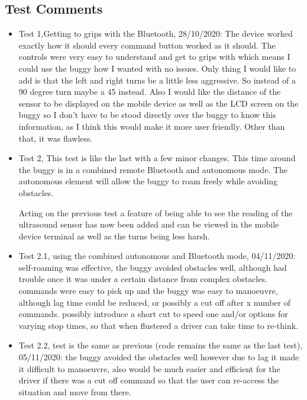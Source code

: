 \documentclass[8pt, a4paper]{article}
\begin{document}
\subsection{Test Comments}
\begin{itemize}


\item Test 1,Getting to grips with the Bluetooth, 28/10/2020: The device worked exactly how it should every command button worked as it should. The controls were very easy to understand and get to grips with which means I could use the buggy how I wanted with no issues. Only thing I would like to add is that the left and right turns be a little less aggressive. So instead of a 90 degree turn maybe a 45 instead. Also I would like the distance of the sensor to be displayed on the mobile device as well as the LCD screen on the buggy so I don’t have to be stood directly over the buggy to know this information, as I think this would make it more user friendly. Other than that, it was flawless.

\item Test 2, This test is like the last with a few minor changes. This time around the buggy is in a combined remote Bluetooth and autonomous mode. The autonomous element will allow the buggy to roam freely while avoiding obstacles.

Acting on the previous test a feature of being able to see the reading of the ultrasound sensor has now been added and can be viewed in the mobile device terminal as well as the turns being less harsh.

\item Test 2.1, using the combined autonomous and Bluetooth mode, 04/11/2020: self-roaming was effective, the buggy avoided obstacles well, although had trouble once it was under a certain distance from complex obstacles. commands were easy to pick up and the buggy was easy to manoeuvre, although lag time could be reduced, or possibly a cut off after x number of commands. possibly introduce a short cut to speed one and/or options for varying stop times, so that when flustered a driver can take time to re-think.

\item Test 2.2, test is the same as previous (code remains the same as the last test), 05/11/2020: the buggy avoided the obstacles well however due to lag it made it difficult to manoeuvre, also would be much easier and efficient for the driver if there was a cut off command so that the user can re-access the situation and move from there.  


\end{itemize}
\end{document}
